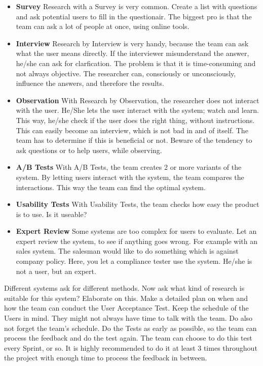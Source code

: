 \documentclass[10pt]{report}
\begin{document}
\begin{itemize}
	\item \textbf{Survey} Research with a Survey is very common. Create a list with questions and ask potential users to fill in the questionair. The biggest pro is that the team can ask a lot of people at once, using online tools.
	\item \textbf{Interview} Research by Interview is very handy, because the team can ask what the user means directly. If the interviewer misunderstand the answer, he/she can ask for clarfication. The problem is that it is time-consuming and not always objective. The researcher can, consciously or unconsciously, influence the answers, and therefore the results.
	\item \textbf{Observation} With Research by Observation, the researcher does not interact with the user. He/She lets the user interact with the system; watch and learn. This way, he/she check if the user does the right thing, without instructions. This can easily become an interview, which is not bad in and of itself. The team has to determine if this is beneficial or not. Beware of the tendency to ask questions or to help users, while observing.
	\item \textbf{A/B Tests} With A/B Tests, the team creates 2 or more variants of the system. By letting users interact with the system, the team compares the interactions. This way the team can find the optimal system.
	\item \textbf{Usability Tests} With Usability Tests, the team checks how easy the product is to use. Is it useable?
	\item \textbf{Expert Review} Some systems are too complex for users to evaluate. Let an expert review the system, to see if anything goes wrong. For example with an sales system. The salesman would like to do something which is against company policy. Here, you let a compliance tester use the system. He/she is not a user, but an expert.
\end{itemize}

Different systems ask for different methods. Now ask what kind of research is suitable for this system? Elaborate on this. Make a detailed plan on when and how the team can conduct the User Acceptance Test. Keep the schedule of the Users in mind. They might not always have time to talk with the team. Do also not forget the team's schedule. Do the Tests as early as possible, so the team can process the feedback and do the test again. The team can choose to do this test every Sprint, or so. It is highly recommended to do it at least 3 times throughout the project with enough time to process the feedback in between.
\end{document}
